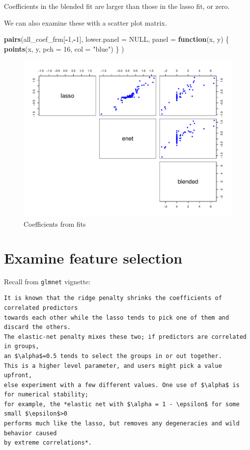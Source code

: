 \documentclass[
]{book}
\newenvironment{Shaded}{\begin{snugshade}}{\end{snugshade}}
\newcommand{\ControlFlowTok}[1]{\textcolor[rgb]{0.13,0.29,0.53}{\textbf{#1}}}
\newcommand{\DataTypeTok}[1]{\textcolor[rgb]{0.13,0.29,0.53}{#1}}
\newcommand{\DecValTok}[1]{\textcolor[rgb]{0.00,0.00,0.81}{#1}}
\newcommand{\KeywordTok}[1]{\textcolor[rgb]{0.13,0.29,0.53}{\textbf{#1}}}
\newcommand{\NormalTok}[1]{#1}
\newcommand{\OperatorTok}[1]{\textcolor[rgb]{0.81,0.36,0.00}{\textbf{#1}}}
\newcommand{\OtherTok}[1]{\textcolor[rgb]{0.56,0.35,0.01}{#1}}
\newcommand{\StringTok}[1]{\textcolor[rgb]{0.31,0.60,0.02}{#1}}
\begin{document}
Coefficients in the blended fit are larger than those in the
lasso fit, or zero.

We can also examine these with a scatter plot matrix.

\begin{Shaded}
\begin{Highlighting}[]
\KeywordTok{pairs}\NormalTok{(all\_coef\_frm[}\OperatorTok{{-}}\DecValTok{1}\NormalTok{,}\OperatorTok{{-}}\DecValTok{1}\NormalTok{],}
  \DataTypeTok{lower.panel =} \OtherTok{NULL}\NormalTok{,}
  \DataTypeTok{panel =} \ControlFlowTok{function}\NormalTok{(x, y) \{}
    \KeywordTok{points}\NormalTok{(x, y, }\DataTypeTok{pch =} \DecValTok{16}\NormalTok{, }\DataTypeTok{col =} \StringTok{"blue"}\NormalTok{)}
\NormalTok{  \}}
\NormalTok{)}
\end{Highlighting}
\end{Shaded}

\begin{figure}
\centering
\includegraphics{Static/figures/hcc5hmC-glmnetFit-pairsCoeffProf-1.pdf}
\caption{\label{fig:hcc5hmC-glmnetFit-pairsCoeffProf}Coefficients from fits}
\end{figure}

\hypertarget{examine-feature-selection}{%
\section{Examine feature selection}\label{examine-feature-selection}}

Recall from \texttt{glmnet} vignette:

\begin{verbatim}
It is known that the ridge penalty shrinks the coefficients of correlated predictors
towards each other while the lasso tends to pick one of them and discard the others.
The elastic-net penalty mixes these two; if predictors are correlated in groups,
an $\alpha$=0.5 tends to select the groups in or out together.
This is a higher level parameter, and users might pick a value upfront,
else experiment with a few different values. One use of $\alpha$ is for numerical stability;
for example, the *elastic net with $\alpha = 1 - \epsilon$ for some small $\epsilon$>0
performs much like the lasso, but removes any degeneracies and wild behavior caused
by extreme correlations*.
\end{verbatim}
\end{document}
